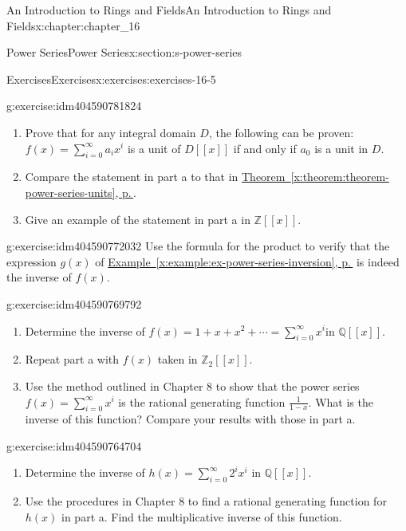 \documentclass[twoside,10pt,]{book}
\newcommand{\xreffont}{\relax}
\numberwithin{equation}{section}
\begin{document}
\begin{chapterptx}{An Introduction to Rings and Fields}{}{An Introduction to Rings and Fields}{}{}{x:chapter:chapter_16}
\begin{sectionptx}{Power Series}{}{Power Series}{}{}{x:section:s-power-series}
\begin{exercises-subsection}{Exercises}{}{Exercises}{}{}{x:exercises:exercises-16-5}
\begin{divisionexercise}{2}{}{}{g:exercise:idm404590781824}
%
\begin{enumerate}[label=(\alph*)]
\item{}Prove that for any integral domain \(D\), the following can be proven: \(f(x)=\sum_{i=0}^{\infty } a_i x^i\) is a unit of \(D[[x]]\) if and only if \(a_0\) is a unit in \(D\).%
\item{}Compare the statement in part a to that in \hyperref[x:theorem:theorem-power-series-units]{Theorem~{\xreffont\ref{x:theorem:theorem-power-series-units}}, p.\,\pageref{x:theorem:theorem-power-series-units}}.%
\item{}Give an example of the statement in part a in \(\mathbb{Z}[[x]]\).%
\end{enumerate}
%
\end{divisionexercise}%
\begin{divisionexercise}{3}{}{}{g:exercise:idm404590772032}%
Use the formula for the product to verify that the expression \(g(x)\) of \hyperref[x:example:ex-power-series-inversion]{Example~{\xreffont\ref{x:example:ex-power-series-inversion}}, p.\,\pageref{x:example:ex-power-series-inversion}} is indeed the inverse of \(f(x)\).%
\end{divisionexercise}%
\begin{divisionexercise}{4}{}{}{g:exercise:idm404590769792}%
%
\begin{enumerate}[label=(\alph*)]
\item{}Determine the inverse of \(f(x) = 1 + x + x^2 + \cdots  = \sum_{i=0}^{\infty } x^i\)in \(\mathbb{Q}[[x]]\).%
\item{}Repeat part a with \(f(x)\) taken in \(\mathbb{Z}_2[[x]]\).%
\item{}Use the method outlined in Chapter 8 to show that the power series \(f(x) = \sum_{i=0}^{\infty } x^i\) is the rational generating function \(\frac{1}{1-x}\). What is the inverse of this function? Compare your results with those in part a.%
\end{enumerate}
%
\end{divisionexercise}%
\begin{divisionexercise}{5}{}{}{g:exercise:idm404590764704}%
%
\begin{enumerate}[label=(\alph*)]
\item{}Determine the inverse of \(h(x) = \sum_{i=0}^{\infty } 2^i x^i\)  in \(\mathbb{Q}[[x]]\).%
\item{}Use the procedures in Chapter 8 to find a rational generating function for \(h(x)\) in part a.  Find the multiplicative inverse of this function.%
\end{enumerate}

\end{divisionexercise}
\end{exercises-subsection}
\end{sectionptx}
\end{chapterptx}
\end{document}
